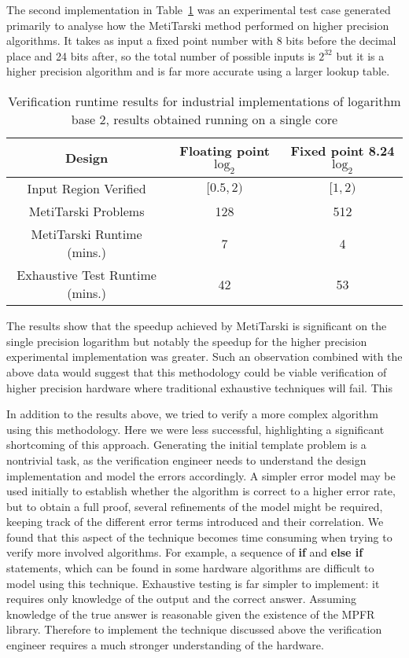\documentclass[a4]{article}
\begin{document}
The second implementation in Table~\ref{result} was an experimental test case generated primarily to analyse how the MetiTarski method performed on higher precision algorithms. It takes as input a fixed point number with 8 bits before the decimal place and 24 bits after, so the total number of possible inputs is $2^{32}$ but it is a higher precision algorithm and is far more accurate using a larger lookup table.

\begin{center}
\begin{table}[h!]
\centering
\begin{tabular}{ccc} 
\toprule
 Design & Floating point $\log_2$ & Fixed point 8.24 $\log_2$    \\
\midrule
 Input Region Verified& $[0.5,2)$ & $[1,2) $ \\ 
 MetiTarski Problems & 128 & 512 \\
 MetiTarski Runtime (mins.) &  7 & 4 \\ 
 Exhaustive Test Runtime (mins.) & 42 & 53 \\ 
\bottomrule
\end{tabular}
\caption{Verification runtime results for industrial implementations of logarithm base 2, results obtained running on a single core}
\label{result}
\end{table}
\end{center}

The results show that the speedup achieved by MetiTarski is significant on the single precision logarithm but notably the speedup for the higher precision experimental implementation was greater. Such an observation combined with the above data would suggest that this methodology could be viable verification of higher precision hardware where traditional exhaustive techniques will fail. This

In addition to the results above, we tried to verify a more complex algorithm using this methodology. Here we were less successful, highlighting a significant shortcoming of this approach. Generating the initial template problem is a nontrivial task, as the verification engineer needs to understand the design implementation and model the errors accordingly. A simpler error model may be used initially to establish whether the algorithm is correct to a higher error rate, but to obtain a full proof, several refinements of the model might be required, keeping track of the different error terms introduced and their correlation. We found that this aspect of the technique becomes time consuming when trying to verify more involved algorithms. For example, a sequence of \textbf{if} and \textbf{else if} statements, which can be found in some hardware algorithms are difficult to model using this technique. Exhaustive testing is far simpler to implement: it requires only knowledge of the output and the correct answer. Assuming knowledge of the true answer is reasonable given the existence of the MPFR library. Therefore to implement the technique discussed above the verification engineer requires a much stronger understanding of the hardware.
 
\end{document}
